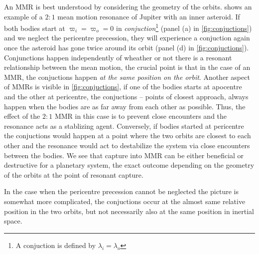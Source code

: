 \documentclass[ twoside,openright,titlepage,numbers=noenddot,headinclude,%
                footinclude=true,cleardoublepage=empty,abstractoff, %
                BCOR=5mm,paper=a4,fontsize=11pt,%
                american,%
                ]{scrreprt}
\begin{document}
An MMR is best understood by considering the geometry of the 
orbits.  shows an example of a $2:1$
mean motion resonance of Jupiter with an inner asteroid. 
If both bodies start at $\varpi_i=\varpi_o=0$ in 
\emph{conjuction}\footnote{A conjuction is defined by 
$\lambda_i=\lambda_o$} (panel (a) in \cref{fig:conjuctions}) and we 
neglect the pericentre precession, they will experience
a conjuction again once the asteroid has gone twice 
around its orbit (panel (d) in \cref{fig:conjuctions}). Conjunctions
happen independently of wheather or not there is a resonant
relationship between the mean motion, the crucial point
is that in the case of an MMR, the conjuctions happen
\emph{at the same position on the orbit}. Another aspect of MMRs
is visible in \cref{fig:conjuctions}, if one of the bodies starts
at apocentre and the other at pericentre, the conjuctions --
points of closest approach, always happen when the bodies 
are as far away from each other as possible. Thus, the effect
of the $2:1$ MMR in this case is to prevent close encounters and 
the resonance acts as a stablizing agent. Conversely, if bodies
started at pericentre the conjuctions would happen at a point 
where the two orbits are closest to each other and the resonance
would act to destabilize the system via close encounters between
the bodies. We see that capture into MMR can be either beneficial
or destructive for a planetary system, the exact outcome
depending on the geometry of the orbits at the point of resonant
capture. 

In the case when the pericentre precession cannot be neglected the
picture is somewhat more complicated, the conjuctions occur 
at the  almost same relative position in the two orbits, but not 
necessarily also at the same position in inertial space.
\end{document}
